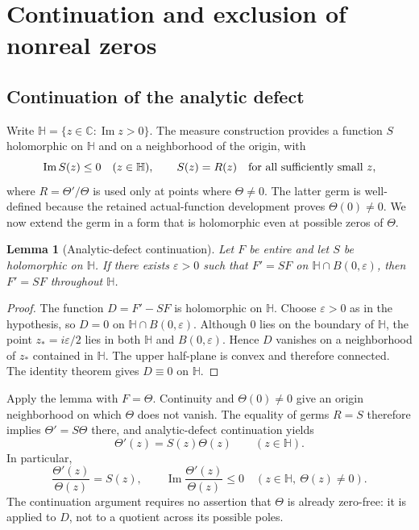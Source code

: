 \documentclass[11pt,a4paper]{article}
\newtheorem{lemma}[theorem]{Lemma}
\theoremstyle{definition}
\numberwithin{equation}{section}
\begin{document}
\section{Continuation and exclusion of nonreal zeros}\label{sec:closure}
\subsection{Continuation of the analytic defect}
Write $\mathbb H=\{z\in\mathbb C:\operatorname{Im}z>0\}$. The measure construction provides a function $S$ holomorphic on $\mathbb H$ and on a neighborhood of the origin, with
\[
 \operatorname{Im}S(z)\leq 0\quad(z\in\mathbb H),
 \qquad S(z)=R(z)\quad\hbox{for all sufficiently small }z,
\]
where $R=\Theta'/\Theta$ is used only at points where $\Theta\ne0$. The latter germ is well-defined because the retained actual-function development proves $\Theta(0)\ne0$. We now extend the germ in a form that is holomorphic even at possible zeros of $\Theta$.

\begin{lemma}[Analytic-defect continuation]
Let $F$ be entire and let $S$ be holomorphic on $\mathbb H$. If there exists $\varepsilon>0$ such that $F'=SF$ on $\mathbb H\cap B(0,\varepsilon)$, then $F'=SF$ throughout $\mathbb H$.
\end{lemma}
\begin{proof}
The function $D=F'-SF$ is holomorphic on $\mathbb H$. Choose $\varepsilon>0$ as in the hypothesis, so $D=0$ on $\mathbb H\cap B(0,\varepsilon)$. Although $0$ lies on the boundary of $\mathbb H$, the point $z_*=i\varepsilon/2$ lies in both $\mathbb H$ and $B(0,\varepsilon)$. Hence $D$ vanishes on a neighborhood of $z_*$ contained in $\mathbb H$. The upper half-plane is convex and therefore connected. The identity theorem gives $D\equiv0$ on $\mathbb H$.
\end{proof}

Apply the lemma with $F=\Theta$. Continuity and $\Theta(0)\ne0$ give an origin neighborhood on which $\Theta$ does not vanish. The equality of germs $R=S$ therefore implies $\Theta'=S\Theta$ there, and analytic-defect continuation yields
\begin{equation}
 \Theta'(z)=S(z)\Theta(z)\qquad(z\in\mathbb H).
 \label{eq:theta-ode}
\end{equation}
In particular,
\begin{equation}
 \frac{\Theta'(z)}{\Theta(z)}=S(z),\qquad
 \operatorname{Im}\frac{\Theta'(z)}{\Theta(z)}\leq0
 \quad(z\in\mathbb H,\ \Theta(z)\ne0).
 \label{eq:logderiv-sign}
\end{equation}
The continuation argument requires no assertion that $\Theta$ is already zero-free: it is applied to $D$, not to a quotient across its possible poles.
\end{document}
